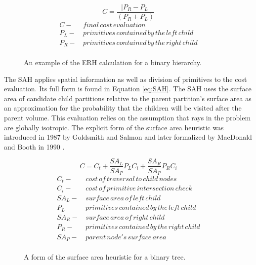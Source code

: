 \begin{figure}[H]
\begin{equation}
\label{eq:ERH}
 C = \frac{|P_{R}-P_{L}|}{(P_{R} + P_{L})} 
\end{equation}
  \begin{align*}
    C - & \,final \, cost \, evaluation \\
    P_{L} - & \, primitives\, contained\, by\, the\, left\, child  \\
    P_{R} - & \, primitives\, contained\, by\, the\, right\, child \\
  \end{align*}
  \caption[Formulation of the entity ratio heuristic.]{An example of the ERH calculation for a binary hierarchy.}
  \label{fig:ERH}
\end{figure}

The SAH applies spatial information as well as division of primitives to the
cost evaluation. Its full form is found in Equation \eqref{eq:SAH}. The SAH uses
the surface area of candidate child partitions relative to the parent
partition's surface area as an approximation for the probability that the children
will be visited after the parent volume. This evaluation relies on the
assumption that rays in the problem are globally isotropic. The explicit form of
the surface area heuristic was introduced in 1987 by Goldsmith and Salmon
\cite{Goldsmith_1987} and later formalized by MacDonald and Booth in 1990
\cite{MacDonald_1990}.

\begin{figure}[H]
  \begin{equation}
    C =  C_{t} + \frac{SA_{L}}{SA_{P}}P_{L}C_{i} +  \frac{SA_{R}}{SA_{P}}P_{R}C_{i}
    \label{eq:SAH}
  \end{equation}
  \begin{align*}
    C_{t} - & \,cost\, of\, traversal\, to\, child\, nodes \\
    C_{i} - & \, cost\, of\, primitive\, intersection\, check\, \\
    SA_{L} - &  \,surface\, area\, of\, left\, child \\
    P_{L} - & \, primitives\, contained\, by\, the\, left\, child  \\
    SA_{R} - & \, surface\, area\, of\, right\, child \\
    P_{R} - & \, primitives\, contained\, by\, the\, right\, child \\
    SA_{P} - & \, parent\, node's \, surface \, area \\
  \end{align*}
  \caption[Formulation of the surface area heuristic.]{A form of the surface area heuristic for a binary tree.}
  \label{fig:SAH}
\end{figure}

